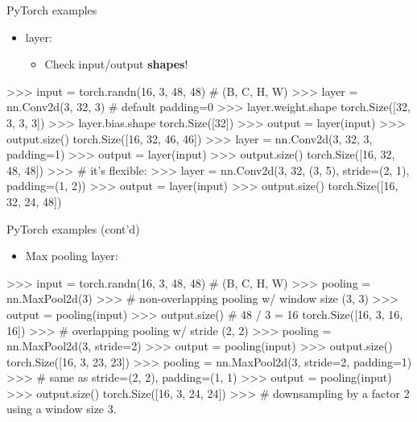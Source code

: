 \begin{frame}[fragile]{PyTorch examples}
\begin{itemize}
\item {} layer:
\begin{itemize}
\item Check input/output \textbf{shapes}!
\end{itemize}
\end{itemize}
\begin{python}
>>> input = torch.randn(16, 3, 48, 48)  # (B, C, H, W)
>>> layer = nn.Conv2d(3, 32, 3)  # default padding=0
>>> layer.weight.shape
torch.Size([32, 3, 3, 3])
>>> layer.bias.shape
torch.Size([32])
>>> output = layer(input)
>>> output.size()
torch.Size([16, 32, 46, 46])
>>> layer = nn.Conv2d(3, 32, 3, padding=1)
>>> output = layer(input)
>>> output.size()
torch.Size([16, 32, 48, 48])
>>> # it's flexible:
>>> layer = nn.Conv2d(3, 32, (3, 5), stride=(2, 1), padding=(1, 2))
>>> output = layer(input)
>>> output.size()
torch.Size([16, 32, 24, 48])
\end{python}
\end{frame}

\begin{frame}[fragile]{PyTorch examples (cont'd)}
\begin{itemize}
\item Max pooling layer: 
\end{itemize}
\begin{python}
>>> input = torch.randn(16, 3, 48, 48)  # (B, C, H, W)
>>> pooling = nn.MaxPool2d(3)
>>> # non-overlapping pooling w/ window size (3, 3)
>>> output = pooling(input)
>>> output.size()  # 48 / 3 = 16
torch.Size([16, 3, 16, 16]) 
>>> # overlapping pooling w/ stride (2, 2)
>>> pooling = nn.MaxPool2d(3, stride=2)
>>> output = pooling(input)
>>> output.size()
torch.Size([16, 3, 23, 23])
>>> pooling = nn.MaxPool2d(3, stride=2, padding=1)
>>> # same as stride=(2, 2), padding=(1, 1)
>>> output = pooling(input)
>>> output.size()
torch.Size([16, 3, 24, 24])
>>> # downsampling by a factor 2 using a window size 3.
\end{python}
\end{frame}


